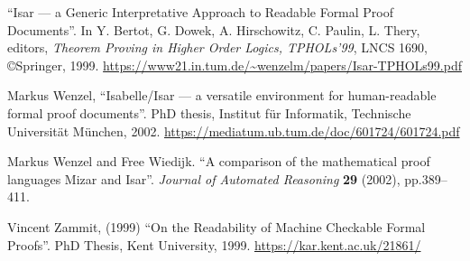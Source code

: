 \begin{enumerate}[label={[\arabic*]},left=0pt]
  ``Isar --- a Generic Interpretative Approach to Readable Formal Proof
  Documents''.
  In Y. Bertot, G. Dowek, A. Hirschowitz, C. Paulin, L. Thery, editors, \emph{Theorem Proving in Higher Order Logics, TPHOLs'99}, LNCS 1690, \copyright Springer, 1999.
  \url{https://www21.in.tum.de/~wenzelm/papers/Isar-TPHOLs99.pdf}
\item\label{wenzel:phd-thesis} Markus Wenzel,
  ``Isabelle/Isar --- a versatile environment for human-readable formal
  proof documents''.
  PhD thesis,
  Institut f\"ur Informatik, Technische Universit\"at M\"unchen, 2002. 
  \url{https://mediatum.ub.tum.de/doc/601724/601724.pdf}
\item Markus Wenzel and Free Wiedijk.
  ``A comparison of the mathematical proof languages Mizar and Isar''.
  \emph{Journal of Automated Reasoning} \textbf{29} (2002), pp.389--411. 
\item\label{zammit:phd-thesis} Vincent Zammit,  (1999)
  ``On the Readability of Machine Checkable Formal Proofs''.
  PhD Thesis, Kent University, 1999.
  \url{https://kar.kent.ac.uk/21861/}
\end{enumerate}